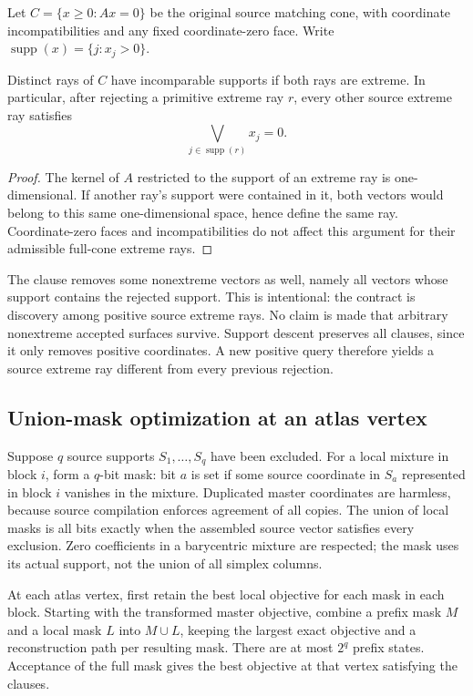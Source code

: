 Let $C=\{x\geq0:Ax=0\}$ be the original source matching cone, with
coordinate incompatibilities and any fixed coordinate-zero face.
Write $\operatorname{supp}(x)=\{j:x_j>0\}$.

\begin{lemma}
Distinct rays of $C$ have incomparable supports if both rays are
extreme.  In particular, after rejecting a primitive extreme ray $r$,
every other source extreme ray satisfies
\[
 \bigvee_{j\in\operatorname{supp}(r)} x_j=0.
 \tag{support exclusion}
\]
\end{lemma}
\begin{proof}
The kernel of $A$ restricted to the support of an extreme ray is
one-dimensional.  If another ray's support were contained in it, both
vectors would belong to this same one-dimensional space, hence define
the same ray.  Coordinate-zero faces and incompatibilities do not
affect this argument for their admissible full-cone extreme rays.
\end{proof}

The clause removes some nonextreme vectors as well, namely all vectors
whose support contains the rejected support.  This is intentional:
the contract is discovery among positive source extreme rays.  No
claim is made that arbitrary nonextreme accepted surfaces survive.
Support descent preserves all clauses, since it only removes positive
coordinates.  A new positive query therefore yields a source extreme
ray different from every previous rejection.

\subsection{Union-mask optimization at an atlas vertex}

Suppose $q$ source supports $S_1,\ldots,S_q$ have been excluded.  For a
local mixture in block $i$, form a $q$-bit mask: bit $a$ is set if some
source coordinate in $S_a$ represented in block $i$ vanishes in the
mixture.  Duplicated master coordinates are harmless, because source
compilation enforces agreement of all copies.  The union of local masks
is all bits exactly when the assembled source vector satisfies every
exclusion.  Zero coefficients in a barycentric mixture are respected;
the mask uses its actual support, not the union of all simplex columns.

At each atlas vertex, first retain the best local objective for each
mask in each block.  Starting with the transformed master objective,
combine a prefix mask $M$ and a local mask $L$ into $M\cup L$, keeping
the largest exact objective and a reconstruction path per resulting
mask.  There are at most $2^q$ prefix states.  Acceptance of the full
mask gives the best objective at that vertex satisfying the clauses.

